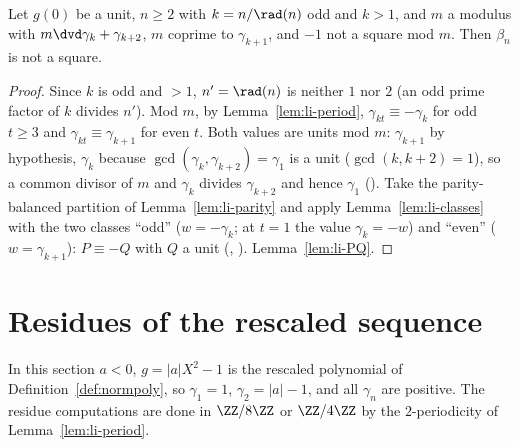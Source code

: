 \begin{proposition}
  \label{lem:li-odd}
  \leanok
  Let $g(0)$ be a unit, $n \ge 2$ with $k = n/\rad(n)$ odd and $k > 1$, and $m$ a modulus with
  $m \dvd \gamma_k + \gamma_{k+2}$, $m$ coprime to $\gamma_{k+1}$, and $-1$ not a square mod $m$.
  Then $\beta_n$ is not a square.
\end{proposition}
\begin{proof}
  \leanok
  Since $k$ is odd and $> 1$, $n' = \rad(n)$ is neither $1$ nor $2$ (an odd prime factor of $k$
  divides $n'$). Mod $m$, by Lemma~\ref{lem:li-period}, $\gamma_{kt} \equiv -\gamma_k$ for odd
  $t \ge 3$ and $\gamma_{kt} \equiv \gamma_{k+1}$ for even $t$. Both values are units mod $m$:
  $\gamma_{k+1}$ by hypothesis, $\gamma_k$ because $\gcd(\gamma_k, \gamma_{k+2}) = \gamma_1$ is a
  unit ($\gcd(k, k+2) = 1$), so a common divisor of $m$ and $\gamma_k$ divides $\gamma_{k+2}$ and
  hence $\gamma_1$ (). Take the
  parity-balanced partition of Lemma~\ref{lem:li-parity} and apply Lemma~\ref{lem:li-classes}
  with the two classes ``odd'' ($w = -\gamma_k$; at $t = 1$ the value $\gamma_k = -w$) and
  ``even'' ($w = \gamma_{k+1}$): $P \equiv -Q$ with $Q$ a unit
  (,
  ). Lemma~\ref{lem:li-PQ}.
\end{proof}

\section{Residues of the rescaled sequence}
\label{sec:li-residues}

In this section $a < 0$, $g = |a| X^2 - 1$ is the rescaled polynomial of
Definition~\ref{def:normpoly}, so $\gamma_1 = 1$, $\gamma_2 = |a| - 1$, and all $\gamma_n$ are
positive. The residue computations are done in $\ZZ/8\ZZ$ or $\ZZ/4\ZZ$ by the $2$-periodicity
of Lemma~\ref{lem:li-period}.

